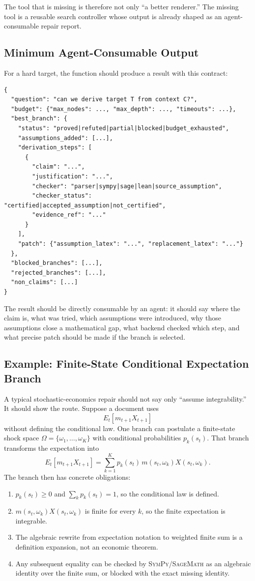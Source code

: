 \documentclass[11pt]{article}
\newcommand{\Sage}{\textsc{SageMath}}
\newcommand{\SymPy}{\textsc{SymPy}}
\begin{document}
The tool that is missing is therefore not only ``a better renderer.'' The
missing tool is a reusable search controller whose output is already shaped as
an agent-consumable repair report.

\subsection{Minimum Agent-Consumable Output}

For a hard target, the function should produce a result with this contract:

\begin{verbatim}
{
  "question": "can we derive target T from context C?",
  "budget": {"max_nodes": ..., "max_depth": ..., "timeouts": ...},
  "best_branch": {
    "status": "proved|refuted|partial|blocked|budget_exhausted",
    "assumptions_added": [...],
    "derivation_steps": [
      {
        "claim": "...",
        "justification": "...",
        "checker": "parser|sympy|sage|lean|source_assumption",
        "checker_status": "certified|accepted_assumption|not_certified",
        "evidence_ref": "..."
      }
    ],
    "patch": {"assumption_latex": "...", "replacement_latex": "..."}
  },
  "blocked_branches": [...],
  "rejected_branches": [...],
  "non_claims": [...]
}
\end{verbatim}

The result should be directly consumable by an agent: it should say where the
claim is, what was tried, which assumptions were introduced, why those
assumptions close a mathematical gap, what backend checked which step, and what
precise patch should be made if the branch is selected.

\subsection{Example: Finite-State Conditional Expectation Branch}

A typical stochastic-economics repair should not say only ``assume
integrability.'' It should show the route. Suppose a document uses
\[
  E_t[m_{t+1} X_{t+1}]
\]
without defining the conditional law. One branch can postulate a finite-state
shock space \(\Omega=\{\omega_1,\ldots,\omega_K\}\) with conditional
probabilities \(p_k(s_t)\). That branch transforms the expectation into
\[
  E_t[m_{t+1}X_{t+1}]
  =
  \sum_{k=1}^K p_k(s_t)\,
  m(s_t,\omega_k) X(s_t,\omega_k).
\]
The branch then has concrete obligations:

\begin{enumerate}[leftmargin=*]
\item \(p_k(s_t)\ge 0\) and \(\sum_k p_k(s_t)=1\), so the conditional law is
  defined.
\item \(m(s_t,\omega_k)X(s_t,\omega_k)\) is finite for every \(k\), so the
  finite expectation is integrable.
\item The algebraic rewrite from expectation notation to weighted finite sum is
  a definition expansion, not an economic theorem.
\item Any subsequent equality can be checked by \SymPy/\Sage{} as an algebraic
  identity over the finite sum, or blocked with the exact missing identity.
\end{enumerate}
\end{document}
